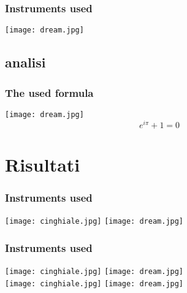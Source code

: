 \documentclass{beamer}
\begin{document}
\begin{frame}
\frametitle{Instruments used}
\centering
\texttt{[image: dream.jpg]}
\end{frame}

\subsection{analisi}

\begin{frame}
\frametitle{The used formula}
\centering
\texttt{[image: dream.jpg]}\\
\begin{equation}
e^{i \pi} + 1 = 0
\end{equation}
\end{frame}


\section{Risultati}

\begin{frame}
\frametitle{Instruments used}
\centering
\texttt{[image: cinghiale.jpg]} 
\texttt{[image: dream.jpg]}
\end{frame}


\begin{frame}
\frametitle{Instruments used}
\centering
\texttt{[image: cinghiale.jpg]} 
\texttt{[image: dream.jpg]} \\ %
\bigskip %
\texttt{[image: cinghiale.jpg]} 
\texttt{[image: dream.jpg]}
\end{frame}
\end{document}
